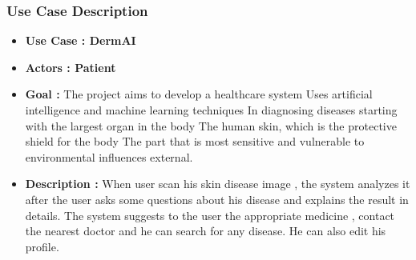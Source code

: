 \subsubsection{Use Case Description }
\begin{itemize}
    \item \textbf{Use Case    :  DermAI}
    \item \textbf{Actors      :  Patient}
    \item \textbf{Goal        :  }The project aims to develop a healthcare system Uses artificial intelligence and machine learning techniques In diagnosing diseases starting with the largest organ in the body The human skin, which is the protective shield for the body The part that is most sensitive and vulnerable to environmental influences external.
     
    \item \textbf{Description :} When user scan his skin disease image , the 
    system analyzes it after 
    the user asks some questions about his disease and explains the result in 
    details. The system 
    suggests to the user the appropriate medicine , contact the nearest doctor 
    and he can search for any disease. He can also edit his profile.\\
\end{itemize}
